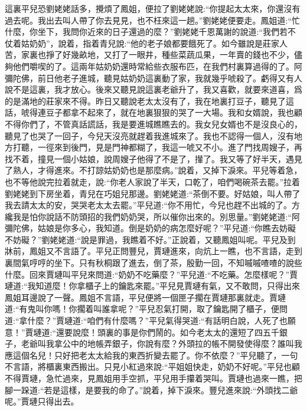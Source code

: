 \begin{parag}
    這裏平兒恐劉姥姥話多，攪煩了鳳姐，便拉了劉姥姥說:“你提起太太來，你還沒有過去呢。我出去叫人帶了你去見見，也不枉來這一趟。”劉姥姥便要走。鳳姐道:“忙什麼，你坐下，我問你近來的日子還過的麼？”劉姥姥千恩萬謝的說道:“我們若不仗着姑奶奶”，說着，指着青兒說:“他的老子娘都要餓死了。如今雖說是莊家人苦，家裏也掙了好幾畝地，又打了一眼井，種些菜蔬瓜果，一年賣的錢也不少，儘夠他們嚼喫的了。這兩年姑奶奶還時常給些衣服布匹，在我們村裏算過得的了。阿彌陀佛，前日他老子進城，聽見姑奶奶這裏動了家，我就幾乎唬殺了。虧得又有人說不是這裏，我才放心。後來又聽見說這裏老爺升了，我又喜歡，就要來道喜，爲的是滿地的莊家來不得。昨日又聽說老太太沒有了，我在地裏打豆子，聽見了這話，唬得連豆子都拿不起來了，就在地裏狠狠的哭了一大場。我和女婿說，我也顧不得你們了，不管真話謊話，我是要進城瞧瞧去的。我女兒女婿也不是沒良心的，聽見了也哭了一回子，今兒天沒亮就趕着我進城來了。我也不認得一個人，沒有地方打聽，一徑來到後門，見是門神都糊了，我這一唬又不小。進了門找周嫂子，再找不着，撞見一個小姑娘，說周嫂子他得了不是了，攆了。我又等了好半天，遇見了熟人，才得進來。不打諒姑奶奶也是那麼病。”說着，又掉下淚來。平兒等着急，也不等他說完拉着就走，說:“你老人家說了半天，口乾了，咱們喝碗茶去罷。”拉着劉姥姥到下房坐着，青兒在巧姐兒那邊。劉姥姥道:“茶倒不要。好姑娘，叫人帶了我去請太太的安，哭哭老太太去罷。”平兒道:“你不用忙，今兒也趕不出城的了。方纔我是怕你說話不防頭招的我們奶奶哭，所以催你出來的。別思量。”劉姥姥道:“阿彌陀佛，姑娘是你多心，我知道。倒是奶奶的病怎麼好呢？”平兒道:“你瞧去妨礙不妨礙？”劉姥姥道:“說是罪過，我瞧着不好。”正說着，又聽鳳姐叫呢。平兒及到牀前，鳳姐又不言語了。平兒正問豐兒，賈璉進來，向炕上一瞧，也不言語，走到裏間氣哼哼的坐下。只有秋桐跟了進去，倒了茶，殷勤一回，不知嘁嘁喳喳的說些什麼。回來賈璉叫平兒來問道:“奶奶不吃藥麼？”平兒道:“不吃藥。怎麼樣呢？”賈璉道:“我知道麼！你拿櫃子上的鑰匙來罷。”平兒見賈璉有氣，又不敢問，只得出來鳳姐耳邊說了一聲。鳳姐不言語，平兒便將一個匣子擱在賈璉那裏就走。賈璉道:“有鬼叫你嗎！你擱着叫誰拿呢？”平兒忍氣打開，取了鑰匙開了櫃子，便問道:“拿什麼？”賈璉道:“咱們有什麼嗎？”平兒氣得哭道:“有話明白說，人死了也願意！”賈璉道:“還要說麼！頭裏的事是你們鬧的。如今老太太的還短了四五千銀子，老爺叫我拿公中的地帳弄銀子，你說有麼？外頭拉的帳不開發使得麼？誰叫我應這個名兒！只好把老太太給我的東西折變去罷了。你不依麼？”平兒聽了，一句不言語，將櫃裏東西搬出。只見小紅過來說:“平姐姐快走，奶奶不好呢。”平兒也顧不得賈璉，急忙過來，見鳳姐用手空抓，平兒用手攥着哭叫。賈璉也過來一瞧，把腳一跺道:“若是這樣，是要我的命了。”說着，掉下淚來。豐兒進來說:“外頭找二爺呢。”賈璉只得出去。
\end{parag}


